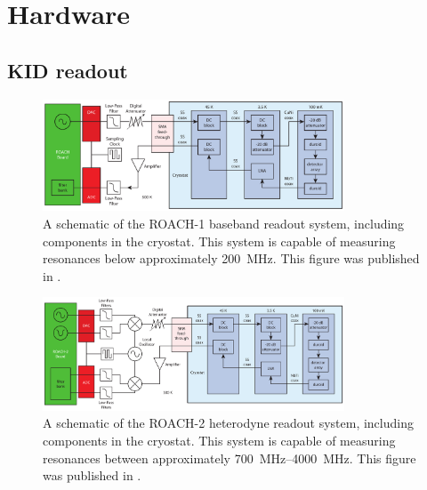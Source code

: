 \chapter{Hardware}
\label{chp:hardware}

\section{KID readout}
\label{sec:hardware.kid_readout}

\begin{figure}[ht]
\centering
\includegraphics[width=0.8\textwidth]{hardware/baseband_readout_schematic.pdf}
\caption[A schematic of the ROACH-1 baseband readout system, including components in the cryostat.]
{
A schematic of the ROACH-1 baseband readout system, including components in the cryostat.
This system is capable of measuring resonances below approximately \SI{200}{MHz}.
This figure was published in \textcite{McCarrick2014RSI}.
}
\label{fig:baseband_readout_schematic}
\end{figure}

\begin{figure}[htb]
\centering
\includegraphics[width=0.8\textwidth]{hardware/heterodyne_readout_schematic.pdf}
\caption[A schematic of the ROACH-2 heterodyne readout system, including components in the cryostat.]
{
A schematic of the ROACH-2 heterodyne readout system, including components in the cryostat.
This system is capable of measuring resonances between approximately \SIrange{700}{4000}{MHz}.
This figure was published in \textcite{Johnson2016SPIE}.
}
\label{fig:heterodyne_readout_schematic}
\end{figure}

